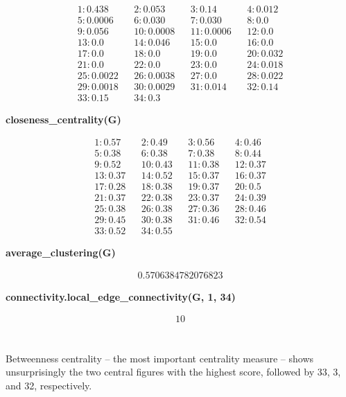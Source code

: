 \documentclass[11pt]{article}
\begin{document}
\begin{align*}
1: 0.438 && 2: 0.053 && 3: 0.14 && 4: 0.012 \\
5: 0.0006 && 6: 0.030 && 7: 0.030 && 8: 0.0 \\
9: 0.056 && 10: 0.0008 && 11: 0.0006 && 12: 0.0 \\
13: 0.0 && 14: 0.046 && 15: 0.0 && 16: 0.0 \\
17: 0.0 && 18: 0.0 && 19: 0.0 && 20: 0.032 \\
21: 0.0 && 22: 0.0 && 23: 0.0 && 24: 0.018 \\
25: 0.0022 && 26: 0.0038 && 27: 0.0 && 28: 0.022 \\
29: 0.0018 && 30: 0.0029 && 31: 0.014 && 32: 0.14 \\
33: 0.15 && 34: 0.3 && && 
\end{align*}

\textbf{closeness\_centrality(G)}

\begin{align*}
1: 0.57 &&  2: 0.49 && 3: 0.56 && 4: 0.46 \\
5: 0.38 && 6: 0.38 && 7: 0.38 && 8: 0.44 \\
9: 0.52 && 10: 0.43 && 11: 0.38 && 12: 0.37 \\
13: 0.37 && 14: 0.52 && 15: 0.37 && 16: 0.37 \\
17: 0.28 && 18: 0.38 && 19: 0.37 && 20: 0.5 \\
21: 0.37 && 22: 0.38 && 23: 0.37 && 24: 0.39 \\
25: 0.38 && 26: 0.38 && 27: 0.36 && 28: 0.46 \\
29: 0.45 && 30: 0.38 && 31: 0.46 && 32: 0.54 \\
33: 0.52 && 34: 0.55 && &&
\end{align*}

\textbf{average\_clustering(G)}

\begin{align*}0.5706384782076823\end{align*}

\textbf{connectivity.local\_edge\_connectivity(G, 1, 34)}

\begin{align*}10\end{align*}

\paragraph{} \hspace{0pt} \\
Betweenness centrality -- the most important centrality measure -- shows unsurprisingly
the two central figures with the highest score, followed by 33, 3, and 32, respectively.
\end{document}
